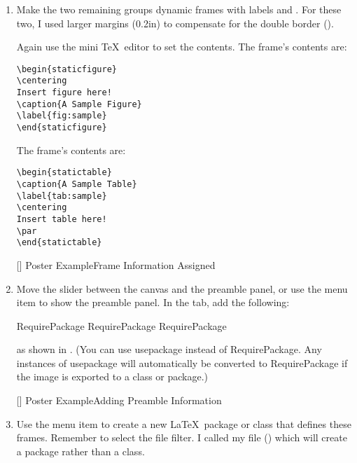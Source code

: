 \begin{enumerate}
\item  Make the two remaining groups dynamic frames
with labels  and . For these two, I used larger
margins (0.2in) to compensate for the double border
().

Again use the mini \TeX\ editor to set the contents. The 
frame's contents are:
\begin{verbatim}
\begin{staticfigure}
\centering
Insert figure here!
\caption{A Sample Figure}
\label{fig:sample}
\end{staticfigure}
\end{verbatim}
The  frame's contents are:
\begin{verbatim}
\begin{statictable}
\caption{A Sample Table}
\label{tab:sample}
\centering
Insert table here!
\par
\end{statictable}
\end{verbatim}

[]
{}
{Poster Example\dash Frame Information Assigned}

\item Move the slider between the \gls{canvas} and the preamble
panel, or use the  menu item to
show the \gls{preamble} panel. In the 
tab, add the following:
\begin{codebox}
\gls{RequirePackage}
\gls{RequirePackage}
\gls{RequirePackage}
\end{codebox}
as shown in . (You can use
\gls{usepackage} instead of \gls{RequirePackage}. Any
instances of \gls{usepackage} will automatically be converted to
\gls{RequirePackage} if the image is exported to a class or
package.)

[]
{}
{Poster Example\dash Adding Preamble Information}

\item Use the  menu item to create
a new \LaTeX\ package or class that defines these frames. Remember to
select the  file filter.
I called my file  () which
will create a package rather than a class.


\end{enumerate}
